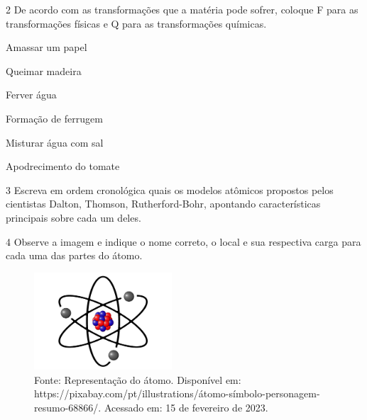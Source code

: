 {\num{2}  De acordo com as transformações que a matéria pode sofrer, coloque F para as transformações físicas e Q para as transformações químicas.

\begin{boxlist}
\item Amassar um papel 

\item Queimar madeira 

\item Ferver água 

\item Formação de ferrugem 

\item Misturar água com sal 

\item Apodrecimento do tomate 
\end{boxlist}

\num{3} Escreva em ordem cronológica quais os modelos atômicos propostos pelos cientistas Dalton, Thomson, Rutherford-Bohr, apontando características principais sobre cada um deles.



\num{4}  Observe a imagem e indique o nome correto, o local e sua respectiva
  carga para cada uma das partes do átomo.

\begin{figure}[htpb!]
\includegraphics[width=2.02609in,height=1.43070in]{./imgs/img7.jpg}
\caption{Fonte: Representação do átomo. Disponível em: https://pixabay.com/pt/illustrations/átomo-símbolo-personagem-resumo-68866/. Acessado em: 15 de fevereiro de 2023.}
\end{figure}

}
